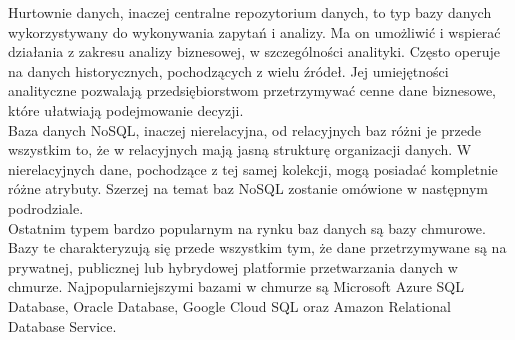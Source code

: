 \documentclass[12pt]{article}
\begin{document}
\begin{sloppypar}
{{    Hurtownie danych, inaczej centralne repozytorium danych, to typ bazy danych wykorzystywany do wykonywania zapytań i analizy. 
    Ma on umożliwić i wspierać działania z zakresu analizy biznesowej, w szczególności analityki. Często operuje na danych historycznych, pochodzących z wielu źródeł. 
    Jej umiejętności analityczne pozwalają przedsiębiorstwom przetrzymywać cenne dane biznesowe, które ułatwiają podejmowanie decyzji.\cite{oracle-warehouse}\\
    Baza danych NoSQL, inaczej nierelacyjna, od relacyjnych baz różni je przede wszystkim to, że w relacyjnych mają jasną strukturę organizacji danych. 
    W nierelacyjnych dane, pochodzące z tej samej kolekcji, mogą posiadać kompletnie różne atrybuty. 
    Szerzej na temat baz NoSQL zostanie omówione w następnym podrodziale.\\
    Ostatnim typem bardzo popularnym na rynku baz danych są bazy chmurowe. Bazy te charakteryzują się przede wszystkim tym, że dane przetrzymywane są na prywatnej,
    publicznej lub hybrydowej platformie przetwarzania danych w chmurze. 
    Najpopularniejszymi bazami w chmurze są Microsoft Azure SQL Database, Oracle Database, Google Cloud SQL oraz Amazon Relational Database Service.
  }
}
\end{sloppypar}
\end{document}
